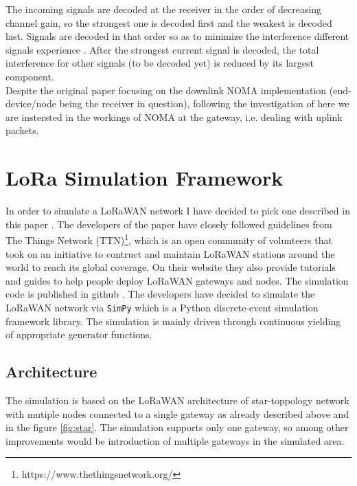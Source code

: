 The incoming signals are decoded at the receiver in the order of decreasing channel gain, so the  strongest one is decoded first and the weakest is decoded last. Signals are decoded in that order so as to minimize the interference different signals experience \cite{noma_imperial}. After the strongest current signal is decoded, the total interference for other signals (to be decoded yet) is reduced by its largest component.\\

Despite the original paper \cite{noma_original} focusing on the downlink NOMA
implementation (end-device/node being the receiver in question), following the investigation of \cite{noma_imperial} here we are instersted in the workings of NOMA at the gateway, i.e. dealing with uplink packets.

\section{LoRa Simulation Framework}

In order to simulate a LoRaWAN network I have decided to pick one described in this paper \cite{simulator}. The developers of the paper have closely followed guidelines from The Things Network (TTN)\footnote{https://www.thethingsnetwork.org/}, which is an open community of volunteers that took on an initiative to contruct and maintain LoRaWAN stations around the world to reach its global coverage. On their website they also provide tutorials and guides to help people deploy LoRaWAN gateways and nodes. The simulation code is published in github \cite{simulator_github}. The developers have decided to simulate the LoRaWAN network via \texttt{SimPy} which is a Python discrete-event simulation framework library\cite{simpy}. The simulation is mainly driven through continuous yielding of appropriate generator functions. 

\subsection{Architecture}

The simulation is based on the LoRaWAN architecture of star-toppology network with mutiple nodes connected to a single gateway as already described above and in the figure \ref{fig:star}. The simulation supports only one gateway, so among other improvements would be introduction of multiple gateways in the simulated area. \\

